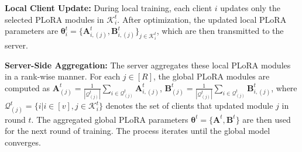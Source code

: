 \documentclass{article} %
\begin{document}






\textbf{Local Client Update:} During local training, each client $i$ updates only the selected PLoRA modules in $\mathcal{K}_i^{t}$. After optimization, the updated local PLoRA parameters are $\boldsymbol{\theta}_i^t=\{{\mathbf{A}_{i,(j)}^{t},\mathbf{B}_{i,(j)}^{t}}\}_{j\in\mathcal{K}_i^{t}}$, which are then transmitted to the server.


\textbf{Server-Side Aggregation:} The server aggregates these local PLoRA modules in a rank-wise manner. For each $j\in[R]$, the global PLoRA modules are computed as ${\mathbf{A}}^t_{(j)}=\frac{1}{|\mathcal{Q}^t_{(j)}|}\sum_{i\in{\mathcal{Q}^t_{(j)}}}\mathbf{A}_{i,(j)}^{t}$, ${\mathbf{B}}^t_{(j)}=\frac{1}{|\mathcal{Q}^t_{(j)}|}\sum_{i\in{\mathcal{Q}^t_{(j)}}}\mathbf{B}_{i,(j)}^{t}$, where $\mathcal{Q}^t_{(j)}=\{i|i\in[v],j\in\mathcal{K}_i^{t} \}$ denotes the set of clients that updated module $j$ in round $t$. The aggregated global PLoRA parameters $\boldsymbol{\theta}^{t} = \{\mathbf{A}^t, \mathbf{B}^t\}$ are then used for the next round of training. The process iterates until the global model converges. 
\end{document}
